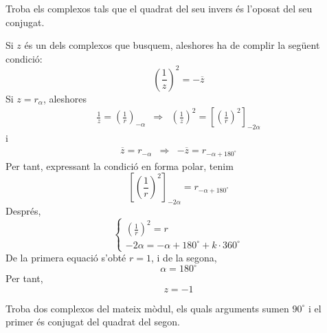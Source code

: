 \begin{exercici}
Troba els complexos tals que el quadrat del seu invers és l’oposat del seu conjugat.
\end{exercici}

\begin{solucio}
Si $z$ és un dels complexos que busquem, aleshores ha de complir la
següent condició:
\[
\left( \frac{1}{z}\right) ^{2}=-\overline{z}
\]
Si $z=r_{\alpha }$, aleshores
\[
\begin{array}{lll}
\frac{1}{z}=\left( \frac{1}{r}\right) _{-\alpha } & \Longrightarrow & \left(
\frac{1}{z}\right) ^{2}=\left[ \left( \frac{1}{r}\right) ^{2}
\right] _{-2\alpha }
\end{array}
\]
i
\[
\begin{array}{lll}
\overline{z}=r_{-\alpha } & \Longrightarrow & -\overline{z}=r_{-\alpha +180
^{\circ}
}
\end{array}
\]
Per tant, expressant la condició en forma polar, tenim
\[
\left[ \left( \frac{1}{r}\right) ^{2}\right] _{-2\alpha }=r_{-\alpha +180
^{\circ}
}
\]
Després,
\[
\left\{
\begin{array}{l}
\left( \frac{1}{r}\right) ^{2}=r \\
-2\alpha =-\alpha +180
^{\circ}
+k\cdot 360
^{\circ}
\end{array}
\right.
\]
De la primera equació s’obté $r=1$, i de la segona,
\[
\alpha =180
^{\circ}
\]
Per tant,
\[
z=-1
\]
\end{solucio}

\begin{exercici}
Troba dos complexos del mateix mòdul, els quals arguments sumen $90
^{\circ}
$ i el primer és conjugat del quadrat del segon.
\end{exercici}


